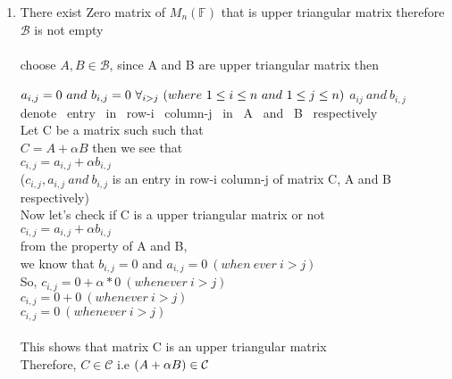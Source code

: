 \documentclass[45pt]{article}
\begin{document}
\begin{enumerate}
\item There exist Zero matrix of $M_n(\mathbb{F})$ that is upper triangular matrix therefore $\mathcal{B}$ is not empty\\\\
choose $A, B \in \mathcal{B} $, since A and B are upper triangular matrix then 

$ a_{i,j}=0 ~ and ~ b_{i,j}=0~ \forall_{i>j} ~ (where ~ 1 \leq i \leq n ~and ~1 \leq j \leq n )\\$
$a_{ij} ~ and ~ b_{i,j}$~ denote~ entry~ in~ row-i ~column-j ~in ~A~ and ~B~ respectively\\
Let C be a matrix such such that \\
$C= A+ \alpha B $ then we see that \\
$c_{i,j}=a_{i,j}+\alpha b_{i,j} $\\
($ c_{i,j},a_{i,j}~ and ~b_{i,j} $ is an entry in row-i column-j of matrix C, A and B respectively)\\

Now let's check if C is a upper triangular matrix or not\\
$c_{i,j}=a_{i,j}+\alpha b_{i,j} $\\
from the property of A and B,\\ we know that $b_{i,j}=0$ and $a_{i,j}=0 ~(when~ever ~i>j)$\\
So, $c_{i,j}=0+\alpha *0 ~(whenever~ i > j)$\\
$c_{i,j}=0+0 ~(whenever ~i>j)$ \\
$c_{i,j}=0 ~(whenever ~ i>j)$ \\\\
This shows that matrix C is an upper triangular matrix\\
Therefore, $ C \in \mathcal{C} $ i.e $(A+\alpha B) \in \mathcal{C}\\\\$
\\\\
\end{enumerate}
\end{document}
